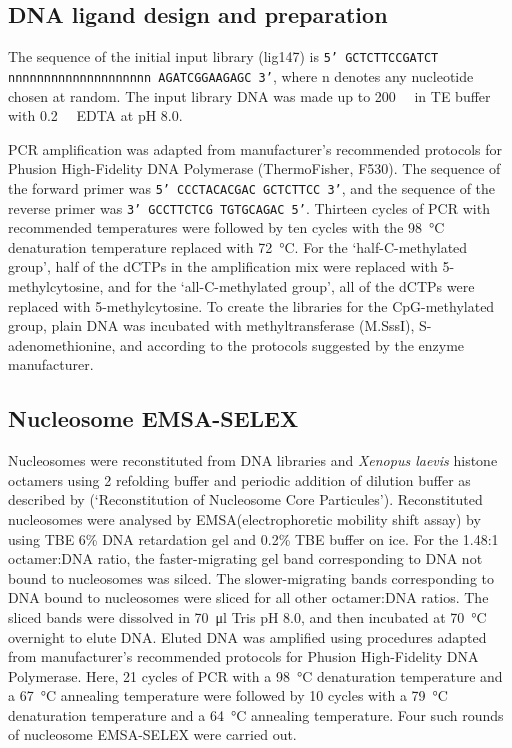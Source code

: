 \documentclass[parskip=full, numbers=noenddot]{scrbook}
\begin{document}
\subsection{DNA ligand design and preparation}
\label{ssec:emsaselex_methods_lig}

The sequence of the initial input library (lig147) is \texttt{5' GCTCTTCCGATCT nnnnnnnnn\-nnnnnnnnnnn AGATCGGAAGAGC 3'}, where n denotes any nucleotide chosen at random. The input library DNA was made up to \SI{200}{\nano\Molar} in TE buffer with \SI{0.2}{\milli\Molar} EDTA at pH 8.0.

PCR amplification was adapted from manufacturer's recommended protocols for Phusion High-Fidelity DNA Polymerase (ThermoFisher, F530).  The sequence of the forward primer was \texttt{5' CCCTACACGAC GCTCTTCC 3'}, and the sequence of the reverse primer was \texttt{3' GCCTTCTCG TGTGCAGAC 5'}.  Thirteen cycles of PCR with recommended temperatures were followed by ten cycles with the \SI{98}{\celsius} denaturation temperature replaced with \SI{72}{\celsius}.  For the `half-C-methylated group', half of the dCTPs in the amplification mix were replaced with 5-methylcytosine, and for the `all-C-methylated group', all of the dCTPs were replaced with 5-methylcytosine.  To create the libraries for the CpG-methylated group, plain DNA was incubated with methyltransferase (M.SssI), S-adenomethionine, and  according to the protocols suggested by the enzyme manufacturer.

\subsection{Nucleosome EMSA-SELEX}
\label{ssec:emsaselex_methods_selex}

Nucleosomes were reconstituted from DNA libraries and \emph{Xenopus laevis} histone octamers using \SI{2}{\Molar}  refolding buffer and periodic addition of dilution buffer as described by \citet{dyer_reconstitution_2003} (`Reconstitution of Nucleosome Core Particules').  Reconstituted nucleosomes were analysed by EMSA(electrophoretic mobility shift assay) by using TBE 6\% DNA retardation gel and 0.2\% TBE buffer on ice.  For the 1.48:1 octamer:DNA ratio, the faster-migrating gel band corresponding to DNA not bound to nucleosomes was silced.  The slower-migrating bands corresponding to DNA bound to nucleosomes were sliced for all other octamer:DNA ratios.  The sliced bands were dissolved in \SI{70}{\micro\litre} Tris pH 8.0, and then incubated at \SI{70}{\celsius} overnight to elute DNA.  Eluted DNA was amplified using procedures adapted from manufacturer's recommended protocols for Phusion High-Fidelity DNA Polymerase.  Here, 21 cycles of PCR with a \SI{98}{\celsius} denaturation temperature and a \SI{67}{\celsius} annealing temperature were followed by 10 cycles with a \SI{79}{\celsius} denaturation temperature and a \SI{64}{\celsius} annealing temperature.  Four such rounds of nucleosome EMSA-SELEX were carried out.
\end{document}
